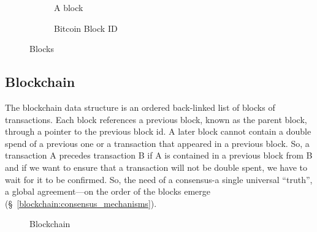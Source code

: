 \begin{figure}[ht!]
  \begin{subfigure}[t]{0.50\textwidth}
    \centering
    \caption{A block}
    \label{fig:block:a}
  \end{subfigure}
  \begin{subfigure}[t]{0.50\textwidth}
    \centering
    \caption{Bitcoin Block ID}
    \label{fig:block:b}
  \end{subfigure}
  \caption{Blocks}
  \label{fig:blocks}
\end{figure}

\subsection{Blockchain}\label{blockchain:structure:blockchain}

The blockchain data structure is an ordered back-linked list of blocks of transactions. Each block references a
previous block, known as the parent block, through a pointer to the previous block id. A later block cannot contain a double spend of a previous one or a transaction that appeared in a previous block.
So, a transaction A precedes transaction B if A is contained in a previous block from B and if we want to ensure that a transaction will not be double spent, we have to
wait for it to be confirmed. So, the need of a consensus-a single universal “truth”, a global agreement---on the order of the blocks emerge (§~\ref{blockchain:consensus_mechanisms}).

\begin{figure}[ht!]
  \centering
  \caption{Blockchain}
  \label{fig:blockchain}
\end{figure}

